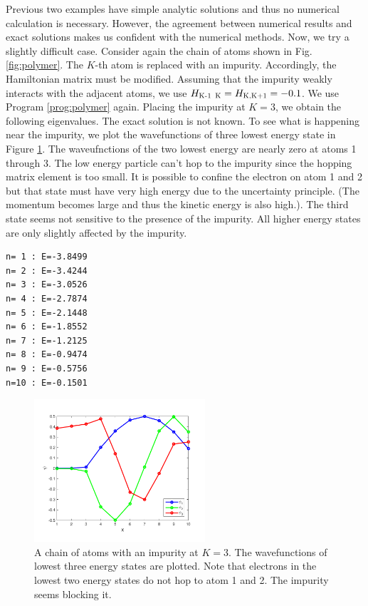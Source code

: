 {\medskip
\noindent
Previous two examples have simple analytic solutions and thus no numerical calculation is necessary.  However, the agreement between numerical results and exact solutions makes us confident with the numerical methods.  Now, we try a slightly difficult case.
Consider again the chain of atoms shown in Fig. \ref{fig:polymer}.  The $K$-th atom is replaced with an impurity.  Accordingly, the Hamiltonian matrix must be modified.  Assuming that the impurity weakly interacts with the adjacent atoms, we use $H_\textsc{K-1\, K}=
H_\textsc{K,K+1} = -0.1$.  We use Program \ref{prog:polymer} again.  Placing the impurity at $K=3$, we obtain the following eigenvalues.  The exact solution is not known. To see what is happening near the impurity, we plot the wavefunctions of three lowest energy state in Figure \ref{fig:tight_binding3}.  The waveufnctions of the two lowest energy are nearly zero at atoms 1 through 3.  The low energy particle can't hop to the impurity since the hopping matrix element is too small.  It is possible to confine the electron on atom 1 and 2 but that state must have very high energy due to the uncertainty principle. (The momentum becomes large and thus the kinetic energy is also high.).  The third state seems not sensitive to the presence of the impurity.  All higher energy states are only slightly affected by the impurity.

\begin{center}
\begin{minipage}{3in}
\small
\begin{Verbatim}[frame=single]
n= 1 : E=-3.8499
n= 2 : E=-3.4244
n= 3 : E=-3.0526
n= 4 : E=-2.7874
n= 5 : E=-2.1448
n= 6 : E=-1.8552
n= 7 : E=-1.2125
n= 8 : E=-0.9474
n= 9 : E=-0.5756
n=10 : E=-0.1501
\end{Verbatim}
\normalsize
\end{minipage}
\end{center}


\begin{figure}
\centering
\includegraphics[width=2.5in]{10.matrix3/tight_binding3}
\caption{A chain of atoms with an impurity at $K=3$.  The wavefunctions of  lowest three energy states are plotted.  Note that electrons in the lowest two energy states do not hop to atom 1 and 2.  The impurity seems blocking it.} 
\label{fig:tight_binding3}
\end{figure}

}
